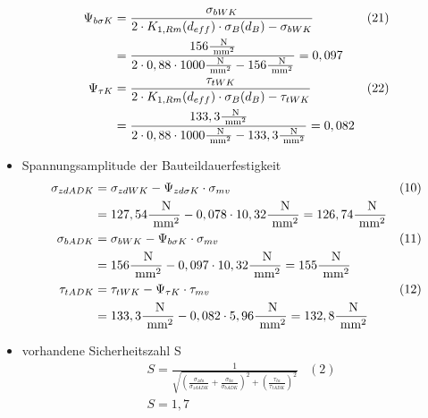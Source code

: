 \begin{itemize}
\begin{align*}
	\Psi_{b \sigma K}&= \frac{\sigma_{bWK}}{2 \cdot  K_{1,Rm} (d_{eff}) \cdot \sigma_B (d_B) -\sigma_{bWK}} &(21) \\
	&=  \frac{156 \frac{\text{ N}}{\text{ mm}^2}}{2 \cdot 0,88 \cdot 1000\frac{\text{ N}}{\text{ mm}^2} - 156 \frac{\text{ N}}{\text{ mm}^2}} = 0,097 \\
	\Psi_{\tau K}&= \frac{\tau_{tWK}}{2 \cdot  K_{1,Rm} (d_{eff}) \cdot \sigma_B (d_B) -\tau_{tWK}} &(22) \\
	&=  \frac{133,3 \frac{\text{ N}}{\text{ mm}^2}}{2 \cdot 0,88 \cdot 1000\frac{\text{ N}}{\text{ mm}^2} - 133,3 \frac{\text{ N}}{\text{ mm}^2}} = 0,082 
	\end{align*}
	\item Spannungsamplitude der Bauteildauerfestigkeit
	\begin{align*}
	\sigma_{zdADK} &= \sigma_{zdWK} - \Psi_{zd \sigma K} \cdot \sigma_{mv} &(10) \\
	&= 127,54\frac{\text{ N}}{\text{ mm}^2} - 0,078 \cdot 10,32 \frac{\text{ N}}{\text{ mm}^2} = 126,74 \frac{\text{ N}}{\text{ mm}^2} \\
	\sigma_{bADK} &= \sigma_{bWK} - \Psi_{b \sigma K} \cdot \sigma_{mv} &(11) \\
	&= 156\frac{\text{ N}}{\text{ mm}^2} - 0,097 \cdot 10,32 \frac{\text{ N}}{\text{ mm}^2} = 155 \frac{\text{ N}}{\text{ mm}^2} \\
	\tau_{tADK} &= \tau_{tWK} - \Psi_{ \tau K} \cdot \tau_{mv} &(12) \\
	&= 133,3\frac{\text{ N}}{\text{ mm}^2} - 0,082 \cdot 5,96 \frac{\text{ N}}{\text{ mm}^2} = 132,8 \frac{\text{ N}}{\text{ mm}^2} 
	\end{align*}
	\item vorhandene Sicherheitszahl S 
	\begin{align*}
	&S= \frac{1}{\sqrt{\left( \frac{\sigma_{zda}}{\sigma_{zdADK}} +\frac{\sigma_{ba}}{\sigma_{bADK}} \right)^2 +\left( \frac{\tau_{ta}}{\tau_{tADK}} \right)^2 }} &(2) \\
	&S=  1,7 
	\end{align*}
\end{itemize}
